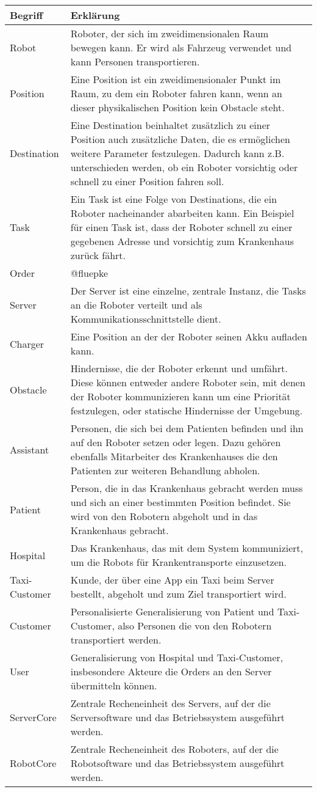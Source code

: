 	\begin{tabularx}{\textwidth}{|l|X|}
		\hline
		\textbf{Begriff} & \textbf{Erklärung}\\ \hline
		Robot & Roboter, der sich im zweidimensionalen Raum bewegen kann. Er wird als Fahrzeug verwendet und kann Personen transportieren.\\ \hline
		Position & Eine Position ist ein zweidimensionaler Punkt im Raum, zu dem ein Roboter fahren kann, wenn an dieser physikalischen Position kein Obstacle steht.\\ \hline
		Destination & Eine Destination beinhaltet zusätzlich zu einer Position auch zusätzliche Daten, die es ermöglichen weitere Parameter festzulegen. 
		Dadurch kann z.B. unterschieden werden, ob ein Roboter vorsichtig oder schnell zu einer Position fahren soll. \\ \hline
		Task & Ein Task ist eine Folge von Destinations, die ein Roboter nacheinander abarbeiten kann. Ein Beispiel für einen Task ist, dass der Roboter schnell zu einer gegebenen Adresse und vorsichtig zum Krankenhaus zurück fährt.\\ \hline
		Order & @fluepke\\ \hline
		Server & Der Server ist eine einzelne, zentrale Instanz, die Tasks an die Roboter verteilt und als Kommunikationsschnittstelle dient.\\ \hline
		Charger & Eine Position an der der Roboter seinen Akku aufladen kann.\\ \hline
		Obstacle & Hindernisse, die der Roboter erkennt und umfährt. Diese können
		entweder andere Roboter sein, mit denen der Roboter kommunizieren kann
		um eine Priorität festzulegen, oder statische Hindernisse der
		Umgebung.\\ \hline
		Assistant & Personen, die sich bei dem Patienten befinden und ihn auf den Roboter setzen oder legen.
		 Dazu gehören ebenfalls Mitarbeiter des Krankenhauses die den Patienten zur weiteren Behandlung abholen.\\ \hline
		Patient & Person, die in das Krankenhaus gebracht werden muss und sich an einer bestimmten Position befindet. 
		Sie wird von den Robotern abgeholt und in das Krankenhaus gebracht.\\ \hline
		Hospital & Das Krankenhaus, das mit dem System kommuniziert, um die Robots für Krankentransporte einzusetzen. \\ \hline
		Taxi-Customer & Kunde, der über eine App ein Taxi beim Server bestellt, abgeholt und zum Ziel transportiert wird.\\ \hline
		Customer & Personalisierte Generalisierung von Patient und Taxi-Customer, also Personen die von den Robotern transportiert werden.\\ \hline
		User & Generalisierung von Hospital und Taxi-Customer, insbesondere Akteure die Orders an den Server übermitteln können.\\ \hline
		ServerCore & Zentrale Recheneinheit des Servers, auf der die Serversoftware und das Betriebssystem ausgeführt werden.\\ \hline
		RobotCore & Zentrale Recheneinheit des Roboters, auf der die Robotsoftware und das Betriebssystem ausgeführt werden.\\ \hline
	\end{tabularx}
